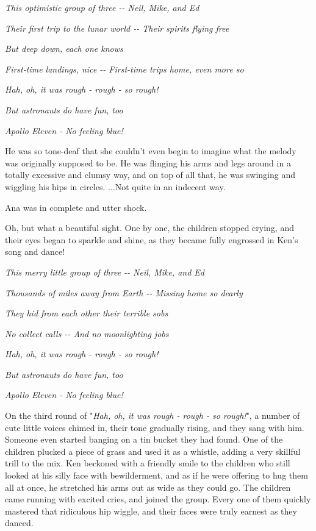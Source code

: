 \documentclass[
]{article}
\begin{document}
\emph{This optimistic group of three -\/- Neil, Mike, and Ed}

\emph{Their first trip to the lunar world -\/- Their spirits flying
free}

\emph{But deep down, each one knows}

\emph{First-time landings, nice -\/- First-time trips home, even more
so}

\emph{Hah, oh, it was rough - rough - so rough!}

\emph{But astronauts do have fun, too}

\emph{Apollo Eleven - No feeling blue!}

He was so tone-deaf that she couldn't even begin to imagine what the
melody was originally supposed to be. He was flinging his arms and legs
around in a totally excessive and clumsy way, and on top of all that, he
was swinging and wiggling his hips in circles. ...Not quite in an
indecent way.

Ana was in complete and utter shock.

Oh, but what a beautiful sight. One by one, the children stopped crying,
and their eyes began to sparkle and shine, as they became fully
engrossed in Ken's song and dance!

\emph{This merry little group of three -\/- Neil, Mike, and Ed}

\emph{Thousands of miles away from Earth -\/- Missing home so dearly}

\emph{They hid from each other their terrible sobs}

\emph{No collect calls -\/- And no moonlighting jobs}

\emph{Hah, oh, it was rough - rough - so rough!}

\emph{But astronauts do have fun, too}

\emph{Apollo Eleven - No feeling blue!}

On the third round of "\emph{Hah, oh, it was rough - rough - so
rough!}", a number of cute little voices chimed in, their tone gradually
rising, and they sang with him. Someone even started banging on a tin
bucket they had found. One of the children plucked a piece of grass and
used it as a whistle, adding a very skillful trill to the mix. Ken
beckoned with a friendly smile to the children who still looked at his
silly face with bewilderment, and as if he were offering to hug them all
at once, he stretched his arms out as wide as they could go. The
children came running with excited cries, and joined the group. Every
one of them quickly mastered that ridiculous hip wiggle, and their faces
were truly earnest as they danced.
\end{document}
